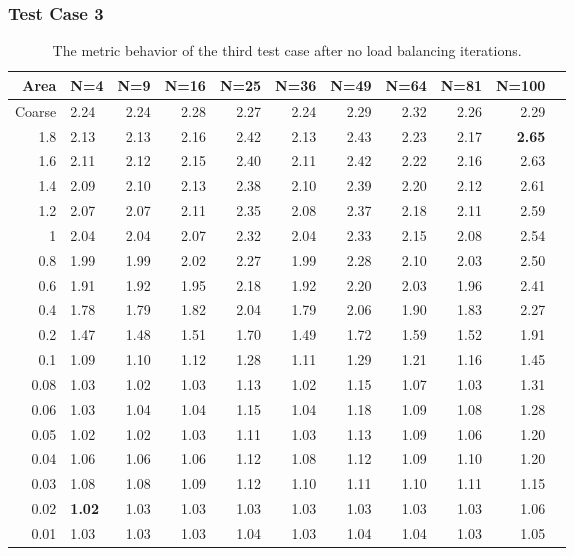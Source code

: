 \documentclass[]{beamer}
\begin{document}
\begin{frame}[t]\frametitle{Test Case 3}
\begin{table}[H]
\tiny
\centering
\caption{The metric behavior of the third test case after no load balancing iterations.} 
\begin{tabular}{rlrrrrrrrrr}
  \hline
 Area & N=4 & N=9 & N=16 & N=25 & N=36 & N=49 & N=64 & N=81 & N=100 \\ 
  \hline
 Coarse & 2.24 & 2.24 & 2.28 & 2.27 & 2.24 & 2.29 & 2.32 & 2.26 & 2.29 \\ 
 1.8 & 2.13 & 2.13 & 2.16 & 2.42 & 2.13 & 2.43 & 2.23 & 2.17 & \textbf{\cellcolor{blue!25}2.65} \\ 
   1.6 & 2.11 & 2.12 & 2.15 & 2.40 & 2.11 & 2.42 & 2.22 & 2.16 & 2.63 \\ 
   1.4 & 2.09 & 2.10 & 2.13 & 2.38 & 2.10 & 2.39 & 2.20 & 2.12 & 2.61 \\ 
 1.2 & 2.07 & 2.07 & 2.11 & 2.35 & 2.08 & 2.37 & 2.18 & 2.11 & 2.59 \\ 
 1 & 2.04 & 2.04 & 2.07 & 2.32 & 2.04 & 2.33 & 2.15 & 2.08 & 2.54 \\ 
 0.8 & 1.99 & 1.99 & 2.02 & 2.27 & 1.99 & 2.28 & 2.10 & 2.03 & 2.50 \\ 
0.6 & 1.91 & 1.92 & 1.95 & 2.18 & 1.92 & 2.20 & 2.03 & 1.96 & 2.41 \\ 
 0.4 & 1.78 & 1.79 & 1.82 & 2.04 & 1.79 & 2.06 & 1.90 & 1.83 & 2.27 \\ 
 0.2 & 1.47 & 1.48 & 1.51 & 1.70 & 1.49 & 1.72 & 1.59 & 1.52 & 1.91 \\ 
   0.1 & 1.09 & 1.10 & 1.12 & 1.28 & 1.11 & 1.29 & 1.21 & 1.16 & 1.45 \\ 
 0.08 & 1.03 & 1.02 & 1.03 & 1.13 & 1.02 & 1.15 & 1.07 & 1.03 & 1.31 \\ 
 0.06 & 1.03 & 1.04 & 1.04 & 1.15 & 1.04 & 1.18 & 1.09 & 1.08 & 1.28 \\ 
0.05 & 1.02 & 1.02 & 1.03 & 1.11 & 1.03 & 1.13 & 1.09 & 1.06 & 1.20 \\ 
 0.04 & 1.06 & 1.06 & 1.06 & 1.12 & 1.08 & 1.12 & 1.09 & 1.10 & 1.20 \\ 
  0.03 & 1.08 & 1.08 & 1.09 & 1.12 & 1.10 & 1.11 & 1.10 & 1.11 & 1.15 \\ 
  0.02 & \textbf{\cellcolor{blue!25}1.02} & 1.03 & 1.03 & 1.03 & 1.03 & 1.03 & 1.03 & 1.03 & 1.06 \\ 
 0.01 & 1.03 & 1.03 & 1.03 & 1.04 & 1.03 & 1.04 & 1.04 & 1.03 & 1.05 \\ 
   \hline
\end{tabular}
\end{table}
\end{frame}
\end{document}
